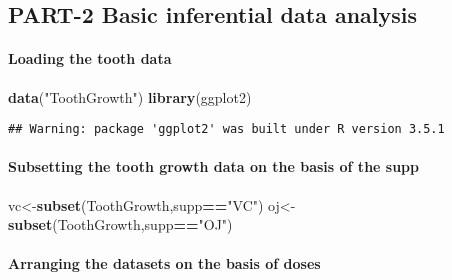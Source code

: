 \documentclass[]{article}
\title{}
\author{Saurabh Yadav}
\date{}
\newenvironment{Shaded}{\begin{snugshade}}{\end{snugshade}}
\newcommand{\KeywordTok}[1]{\textcolor[rgb]{0.13,0.29,0.53}{\textbf{#1}}}
\newcommand{\StringTok}[1]{\textcolor[rgb]{0.31,0.60,0.02}{#1}}
\newcommand{\OperatorTok}[1]{\textcolor[rgb]{0.81,0.36,0.00}{\textbf{#1}}}
\newcommand{\NormalTok}[1]{#1}
\let\oldparagraph\paragraph
\renewcommand{\paragraph}[1]{\oldparagraph{#1}\mbox{}}
\begin{document}
\subsection{PART-2 Basic inferential data
analysis}\label{part-2-basic-inferential-data-analysis}

\paragraph{Loading the tooth data}\label{loading-the-tooth-data}

\begin{Shaded}
\begin{Highlighting}[]
\KeywordTok{data}\NormalTok{(}\StringTok{"ToothGrowth"}\NormalTok{)}
\KeywordTok{library}\NormalTok{(ggplot2)}
\end{Highlighting}
\end{Shaded}

\begin{verbatim}
## Warning: package 'ggplot2' was built under R version 3.5.1
\end{verbatim}

\paragraph{Subsetting the tooth growth data on the basis of the
supp}\label{subsetting-the-tooth-growth-data-on-the-basis-of-the-supp}

\begin{Shaded}
\begin{Highlighting}[]
\NormalTok{vc<-}\KeywordTok{subset}\NormalTok{(ToothGrowth,supp}\OperatorTok{==}\StringTok{"VC"}\NormalTok{)}
\NormalTok{oj<-}\KeywordTok{subset}\NormalTok{(ToothGrowth,supp}\OperatorTok{==}\StringTok{"OJ"}\NormalTok{)}
\end{Highlighting}
\end{Shaded}

\paragraph{Arranging the datasets on the basis of
doses}\label{arranging-the-datasets-on-the-basis-of-doses}
\end{document}

